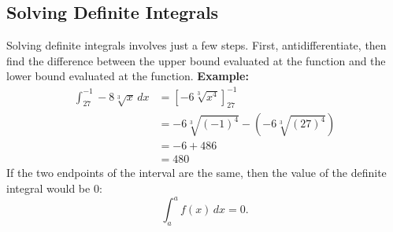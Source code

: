 \documentclass[12pt]{article}
\begin{document}
        \subsection{Solving Definite Integrals}
            Solving definite integrals involves just a few steps. First, antidifferentiate, then find the difference between the upper bound evaluated at the function and the lower bound evaluated at the function.
            \newline \newline
            \textbf{Example:}
            \begin{align*}
                \int_{27}^{-1} -8 \sqrt[3]{x} \, dx &= \left[ -6 \sqrt[3]{x^4} \right]_{27}^{-1} \\
                &= -6 \sqrt[3]{(-1)^4} - \left( -6 \sqrt[3]{(27)^4} \right) \\
                &= -6 + 486 \\
                &= 480
            \end{align*}
            \newline
            If the two endpoints of the interval are the same, then the value of the definite integral would be $0$:
            \[ \int_{a}^{a} f(x) \, dx = 0. \]
\end{document}
